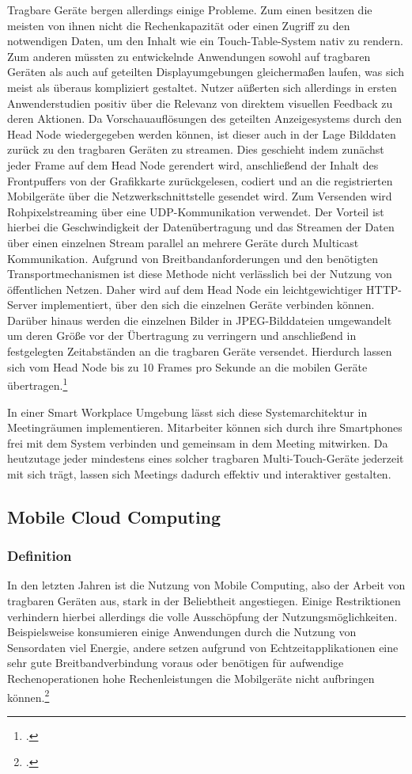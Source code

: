 Tragbare Geräte bergen allerdings einige Probleme. Zum einen besitzen die meisten von ihnen nicht die Rechenkapazität oder einen Zugriff zu den notwendigen Daten, um den Inhalt wie ein Touch-Table-System nativ zu rendern. Zum anderen müssten zu entwickelnde Anwendungen sowohl auf tragbaren Geräten als auch auf geteilten Displayumgebungen gleichermaßen laufen, was sich meist als überaus kompliziert gestaltet. Nutzer aüßerten sich allerdings in ersten Anwenderstudien positiv über die Relevanz von direktem visuellen Feedback zu deren Aktionen. Da Vorschauauflösungen des geteilten Anzeigesystems durch den Head Node wiedergegeben werden können, ist dieser auch in der Lage Bilddaten zurück zu den tragbaren Geräten zu streamen. Dies geschieht indem zunächst jeder Frame auf dem Head Node gerendert wird, anschließend der Inhalt des Frontpuffers von der Grafikkarte zurückgelesen, codiert und an die registrierten Mobilgeräte über die Netzwerkschnittstelle gesendet wird.
Zum Versenden wird Rohpixelstreaming über eine UDP-Kommunikation verwendet. Der Vorteil ist hierbei die Geschwindigkeit der Datenübertragung und das Streamen der Daten über einen einzelnen Stream parallel an mehrere Geräte durch Multicast Kommunikation. Aufgrund von Breitbandanforderungen und den benötigten Transportmechanismen ist diese Methode nicht verlässlich bei der Nutzung von öffentlichen Netzen. Daher wird auf dem Head Node ein leichtgewichtiger HTTP-Server implementiert, über den sich die einzelnen Geräte verbinden können. Darüber hinaus werden die einzelnen Bilder in JPEG-Bilddateien umgewandelt um deren Größe vor der Übertragung zu verringern und anschließend in festgelegten Zeitabständen an die tragbaren Geräte versendet. Hierdurch lassen sich vom Head Node bis zu 10 Frames pro Sekunde an die mobilen Geräte übertragen.\footcite[Vgl.][Seite 652 f.]{Table}

In einer Smart Workplace Umgebung lässt sich diese Systemarchitektur in Meetingräumen implementieren. Mitarbeiter können sich durch ihre Smartphones frei mit dem System verbinden und gemeinsam in dem Meeting mitwirken. Da heutzutage jeder mindestens eines solcher tragbaren Multi-Touch-Geräte jederzeit mit sich trägt, lassen sich Meetings dadurch effektiv und interaktiver gestalten.

\subsection{Mobile Cloud Computing}
\subsubsection{Definition}
In den letzten Jahren ist die Nutzung von Mobile Computing, also der Arbeit von tragbaren Geräten aus, stark in der Beliebtheit angestiegen. Einige Restriktionen verhindern hierbei allerdings die volle Ausschöpfung der Nutzungsmöglichkeiten. Beispielsweise konsumieren einige Anwendungen durch die Nutzung von Sensordaten viel Energie, andere setzen aufgrund von Echtzeitapplikationen eine sehr gute Breitbandverbindung voraus oder benötigen für aufwendige Rechenoperationen hohe Rechenleistungen die Mobilgeräte nicht aufbringen können.\footcite[Vgl.][Seite 84]{MCC}

